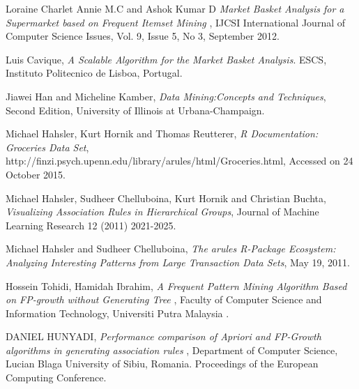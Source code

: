 \documentclass{article}\usepackage[]{graphicx}\usepackage[]{color}
\begin{document}


\newpage

\begin{thebibliography}{9}

    Loraine Charlet Annie M.C and Ashok Kumar D
    \emph{Market Basket Analysis for a Supermarket based on Frequent Itemset Mining },
    IJCSI International Journal of Computer Science Issues, Vol. 9, Issue 5, No 3, September 2012.

  Luis Cavique, \emph{ A Scalable Algorithm for the Market Basket Analysis}.
  ESCS, Instituto Politecnico de Lisboa, Portugal.
 
  Jiawei Han and Micheline Kamber, \emph{ Data Mining:Concepts and Techniques},
  Second Edition,
  University of Illinois at Urbana-Champaign.
  
  Michael Hahsler, Kurt Hornik and Thomas Reutterer, \emph{ R Documentation: Groceries Data Set},
  http://finzi.psych.upenn.edu/library/arules/html/Groceries.html,
  Accessed on 24 October 2015.
  
  Michael Hahsler, Sudheer Chelluboina, Kurt Hornik and Christian Buchta,
  \emph{ Visualizing Association Rules in Hierarchical Groups},
  Journal of Machine Learning Research 12 (2011) 2021-2025.
  
  Michael Hahsler and Sudheer Chelluboina,
  \emph{ The arules R-Package Ecosystem: Analyzing Interesting Patterns from Large Transaction Data Sets},
  May 19, 2011.
  
  Hossein Tohidi, Hamidah Ibrahim,
  \emph{ A Frequent Pattern Mining Algorithm Based on FP-growth without Generating Tree },
  Faculty of Computer Science and Information Technology,
  Universiti Putra Malaysia .
  
  
  DANIEL HUNYADI,
  \emph{ Performance comparison of Apriori and FP-Growth algorithms in generating association rules },
  Department of Computer Science, 
  Lucian Blaga University of Sibiu, Romania.
  Proceedings of the European Computing Conference.
  
  
\end{thebibliography}
\end{document}
